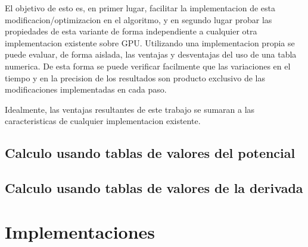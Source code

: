 \documentclass[a4paper,10pt]{report}
\begin{document}
El objetivo de esto es, en primer lugar, facilitar la implementacion de esta modificacion/optimizacion en el algoritmo, y en segundo lugar probar las propiedades de esta variante de forma independiente a cualquier otra implementacion existente sobre GPU. 
Utilizando una implementacion propia se puede evaluar, de forma aislada, las ventajas y desventajas del uso de una tabla numerica. De esta forma se puede verificar facilmente que las variaciones en el tiempo y en la precision de los resultados son producto exclusivo de las modificaciones implementadas en cada paso.

Idealmente, las ventajas resultantes de este trabajo se sumaran a las caracteristicas de cualquier implementacion existente. 









\section{Calculo usando tablas de valores del potencial }





\section{Calculo usando tablas de valores de la derivada  }

\chapter{Implementaciones}

\end{document}

